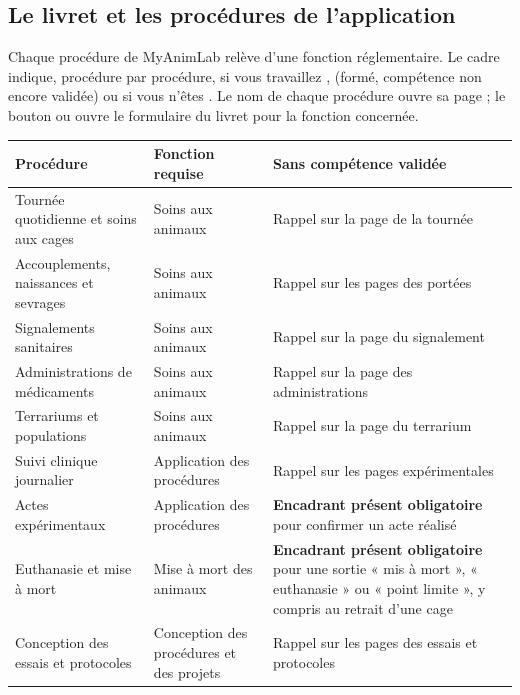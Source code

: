 \documentclass[11pt,a4paper]{article}
\begin{document}
\subsection{Le livret et les procédures de l'application}\label{sec:livret-procedures}
Chaque procédure de MyAnimLab relève d'une fonction réglementaire. Le cadre
 indique, procédure par procédure,
si vous travaillez ,  (formé, compétence non
encore validée) ou si vous n'êtes . Le nom de chaque procédure ouvre sa page ; le bouton
 ou  ouvre le
formulaire du livret pour la fonction concernée.

\begin{center}
\small
{}
\begin{tabularx}{\textwidth}{@{}>{\raggedright\arraybackslash}p{5.2cm}>{\raggedright\arraybackslash}p{3.6cm}X@{}}
\toprule
\textbf{Procédure} & \textbf{Fonction requise} & \textbf{Sans compétence validée}\\
\midrule
Tournée quotidienne et soins aux cages & Soins aux animaux & Rappel sur la page de la tournée\\
Accouplements, naissances et sevrages & Soins aux animaux & Rappel sur les pages des portées\\
Signalements sanitaires & Soins aux animaux & Rappel sur la page du signalement\\
Administrations de médicaments & Soins aux animaux & Rappel sur la page des administrations\\
Terrariums et populations & Soins aux animaux & Rappel sur la page du terrarium\\
Suivi clinique journalier & Application des procédures & Rappel sur les pages expérimentales\\
Actes expérimentaux & Application des procédures & \textbf{Encadrant présent obligatoire} pour confirmer un acte réalisé\\
Euthanasie et mise à mort & Mise à mort des animaux & \textbf{Encadrant présent obligatoire} pour une sortie « mis à mort », « euthanasie » ou « point limite », y compris au retrait d'une cage\\
Conception des essais et protocoles & Conception des procédures et des projets & Rappel sur les pages des essais et protocoles\\
\bottomrule
\end{tabularx}
\end{center}
\end{document}
